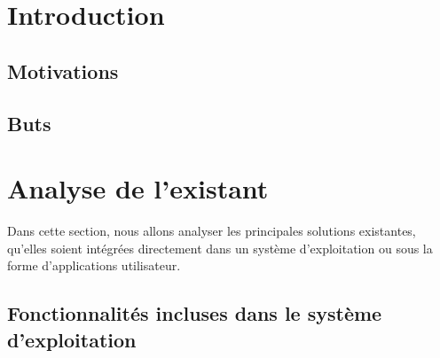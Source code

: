 \documentclass[a4paper, 12pt]{article}
\begin{document}
\section{Introduction} %
\cite{ref0}
\cite{ref1}
\cite{ref2}
\cite{ref3}
\cite{ref4}
\cite{ref5}
\cite{ref6}
\cite{ref7}
\cite{ref8}
\cite{ref9}
\cite{ref10}
\cite{ref11}
\subsection{Motivations}
\subsection{Buts}


\section{Analyse de l'existant} %
Dans cette section, nous allons analyser les principales solutions existantes, qu'elles soient 
intégrées directement dans un système d'exploitation ou sous la forme d'applications utilisateur.

\subsection{Fonctionnalités incluses dans le système d'exploitation}
\end{document}

